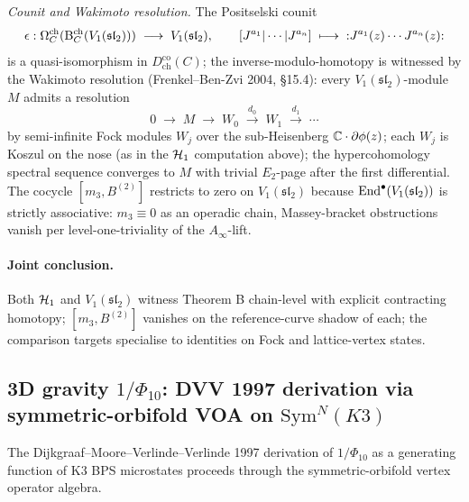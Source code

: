 \emph{Counit and Wakimoto resolution.} The Positselski counit
\begin{equation}
\label{eq:voa-V1sl2-counit}
  \epsilon : \Omega^{\mathrm{ch}}_C(\mathrm{B}^{\mathrm{ch}}_C(V_1(\mathfrak{sl}_2))) \;\longrightarrow\; V_1(\mathfrak{sl}_2),
  \qquad [J^{a_1}|\cdots|J^{a_n}] \;\longmapsto\; {:}J^{a_1}(z)\cdots J^{a_n}(z){:}
\end{equation}
is a quasi-isomorphism in $D^{\mathrm{co}}_{\mathrm{ch}}(C)$; the
inverse-modulo-homotopy is witnessed by the Wakimoto resolution
(Frenkel--Ben-Zvi 2004, \S15.4): every $V_1(\mathfrak{sl}_2)$-module
$M$ admits a resolution
\begin{equation}
\label{eq:voa-wakimoto}
  0 \;\longrightarrow\; M \;\longrightarrow\; W_0 \;\xrightarrow{d_0}\; W_1 \;\xrightarrow{d_1}\; \cdots
\end{equation}
by semi-infinite Fock modules $W_j$ over the sub-Heisenberg
$\mathbb{C}\cdot\partial\phi(z)$; each $W_j$ is Koszul on the nose
(as in the $\mathcal{H}_1$ computation above); the hypercohomology spectral
sequence converges to $M$ with trivial $E_2$-page after the first
differential. The cocycle $[m_3, B^{(2)}]$ restricts to zero on
$V_1(\mathfrak{sl}_2)$ because $\operatorname{End}^\bullet(V_1(\mathfrak{sl}_2))$ is
strictly associative: $m_3 \equiv 0$ as an operadic chain,
Massey-bracket obstructions vanish per level-one-triviality of the
$A_\infty$-lift.

\paragraph{Joint conclusion.}
Both $\mathcal{H}_1$ and $V_1(\mathfrak{sl}_2)$ witness Theorem B chain-level
with explicit contracting homotopy; $[m_3, B^{(2)}]$ vanishes on the
reference-curve shadow of each; the comparison targets specialise to
identities on Fock and lattice-vertex states.

\subsection{3D gravity $1/\Phi_{10}$: DVV 1997 derivation via symmetric-orbifold VOA on $\mathrm{Sym}^N(K3)$}
\label{subsec:voa-dvv-symorbifold}

The Dijkgraaf--Moore--Verlinde--Verlinde 1997 derivation of
$1/\Phi_{10}$ as a generating function of K3 BPS microstates proceeds
through the symmetric-orbifold vertex operator algebra.

